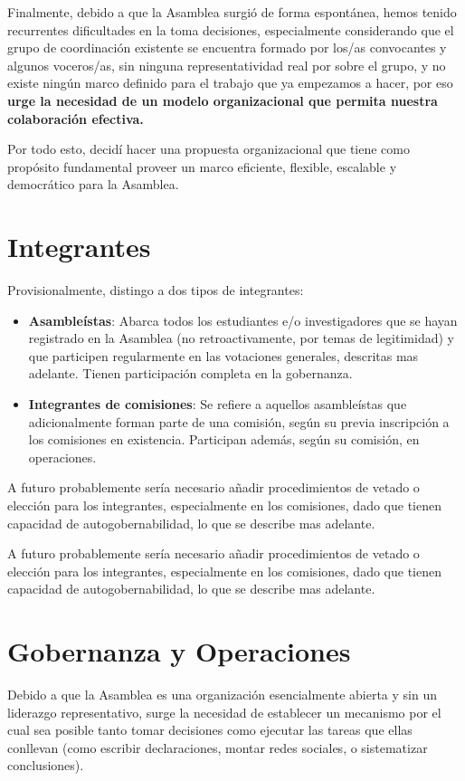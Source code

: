 \documentclass[justified]{tufte-handout} %
\begin{document}
Finalmente, debido a que la Asamblea surgió de forma espontánea, hemos tenido recurrentes dificultades en la toma decisiones, especialmente considerando que el grupo de coordinación existente se encuentra formado por los/as convocantes y algunos voceros/as, sin ninguna representatividad real por sobre el grupo, y no existe ningún marco definido para el trabajo que ya empezamos a hacer, por eso \textbf{urge la necesidad de un modelo organizacional que permita nuestra colaboración efectiva.}

Por todo esto, decidí hacer una propuesta organizacional que tiene como propósito fundamental proveer un marco eficiente, flexible, escalable y democrático para la Asamblea.
\pagebreak

\section{Integrantes}\label{sec:integrantes}

Provisionalmente, distingo a dos tipos de integrantes:
\begin{itemize}
	\item \textbf{Asambleístas}: Abarca todos los estudiantes e/o investigadores que se hayan registrado en la Asamblea (no retroactivamente, por temas de legitimidad) y que participen regularmente en las votaciones generales, descritas mas adelante. Tienen participación completa en la gobernanza.
	\item \textbf{Integrantes de comisiones}: Se refiere a aquellos asambleístas que adicionalmente forman parte de una comisión, según su previa inscripción a los comisiones en existencia. Participan además, según su comisión, en operaciones.
\end{itemize}
A futuro probablemente sería necesario añadir procedimientos de vetado o elección para los integrantes, especialmente en los comisiones, dado que tienen capacidad de autogobernabilidad, lo que se describe mas adelante.

A futuro probablemente sería necesario añadir procedimientos de vetado o elección para los integrantes, especialmente en los comisiones, dado que tienen capacidad de autogobernabilidad, lo que se describe mas adelante.

\section{Gobernanza y Operaciones}\label{sec:gobyop}
Debido a que la Asamblea es una organización esencialmente abierta y sin un liderazgo representativo, surge la necesidad de establecer un mecanismo por el cual sea posible tanto tomar decisiones como ejecutar las tareas que ellas conllevan (como escribir declaraciones, montar redes sociales, o sistematizar conclusiones).
\end{document}
